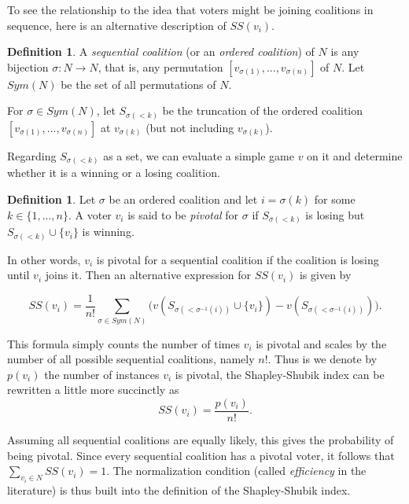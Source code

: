 \documentclass[11pt]{amsart}
\theoremstyle{plain}
\theoremstyle{definition}
\newtheorem{defin}[thm]{Definition}
\theoremstyle{remark}
\begin{document}
To see the relationship to the idea that voters might be joining coalitions in sequence, here is an alternative description of $SS(v_i)$.

\begin{defin}
A \emph{sequential coalition} (or an \emph{ordered coalition}) of $N$ is any bijection $\sigma: N \rightarrow N$, that is, any permutation $[v_{\sigma(1)}, ..., v_{\sigma(n)}]$ of $N$. Let $Sym(N)$ be the set of all permutations of $N$.
\end{defin}

For $\sigma\in Sym(N)$, let $S_{\sigma(<k)}$ be the truncation of the ordered coalition $[v_{\sigma(1)}, ..., v_{\sigma(n)}]$ at $v_{\sigma(k)}$ (but not including $v_{\sigma(k)}$).

Regarding $S_{\sigma(<k)}$ as a set, we can evaluate a simple game $v$ on it and determine whether it is a winning or a losing coalition.

\begin{defin} Let $\sigma$ be an ordered coalition and let $i=\sigma(k)$ for some $k\in \{1,...,n\}$. 
A voter $v_i$ is said to be \emph{pivotal} for $\sigma$ if $S_{\sigma(<k)}$ is losing but $S_{\sigma(<k)}\cup \{v_i\}$ is winning.
\end{defin}

In other words, $v_i$ is pivotal for a sequential coalition if the coalition is losing until $v_i$ joins it. Then an alternative expression for $SS(v_i)$ is given by

\begin{equation}\label{E:ShapleyShubik}
SS(v_i)=\frac{1}{n!}\sum_{\sigma\in Sym(N)} \big(v(S_{\sigma(<\sigma^{-1}(i))}\cup \{v_i\}) - v(S_{\sigma(<\sigma^{-1}(i))})  \big).
\end{equation}


This formula simply counts the number of times $v_i$ is pivotal and scales by the number of all possible sequential coalitions, namely $n!$. Thus is we denote by $p(v_i)$ the number of instances $v_i$ is pivotal, the Shapley-Shubik index can be rewritten a little more succinctly as 
$$SS(v_i)=\frac{p(v_i)}{n!}.$$
%

Assuming all sequential coalitions are equally likely, this gives the probability of being pivotal. Since every sequential coalition has a pivotal voter, it follows that $\sum_{v_i\in N}SS(v_i)=1$. The normalization condition (called \emph{efficiency} in the literature) is thus built into the definition of the Shapley-Shubik index.
\end{document}

